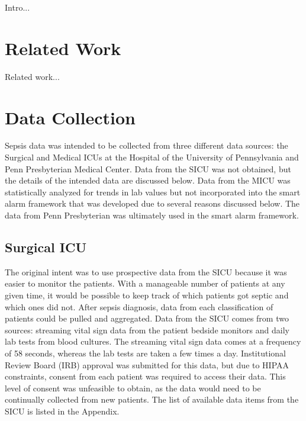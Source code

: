 \documentclass{sig-alternate}
\begin{document}
Intro...

\vspace{10pt}
\section{Related Work}
\vspace{10pt}
\label{sec:related_work}
Related work...

\vspace{10pt}
\section{Data Collection}
\vspace{10pt}
\label{sec:data}

Sepsis data was intended to be collected from three different data sources: the Surgical and Medical ICUs at the Hospital of the University of Pennsylvania and Penn Presbyterian Medical Center.  Data from the SICU was not obtained, but the details of the intended data are discussed below.  Data from the MICU was statistically analyzed for trends in lab values but not incorporated into the smart alarm framework that was developed due to several reasons discussed below.  The data from Penn Presbyterian was ultimately used in the smart alarm framework.

\vspace{10pt}
\subsection{Surgical ICU}
\label{subsec:sicu}
\vspace{10pt}

The original intent was to use prospective data from the SICU because it was easier to monitor the patients.  With a manageable number of patients at any given time, it would be possible to keep track of which patients got septic and which ones did not.  After sepsis diagnosis, data from each classification of patients could be pulled and aggregated.  Data from the SICU comes from two sources: streaming vital sign data from the patient bedside monitors and daily lab tests from blood cultures.  The streaming vital sign data comes at a frequency of 58 seconds, whereas the lab tests are taken a few times a day.  Institutional Review Board (IRB) approval was submitted for this data, but due to HIPAA constraints, consent from each patient was required to access their data.  This level of consent was unfeasible to obtain, as the data would need to be continually collected from new patients.  The list of available data items from the SICU is listed in the Appendix.
\end{document}
